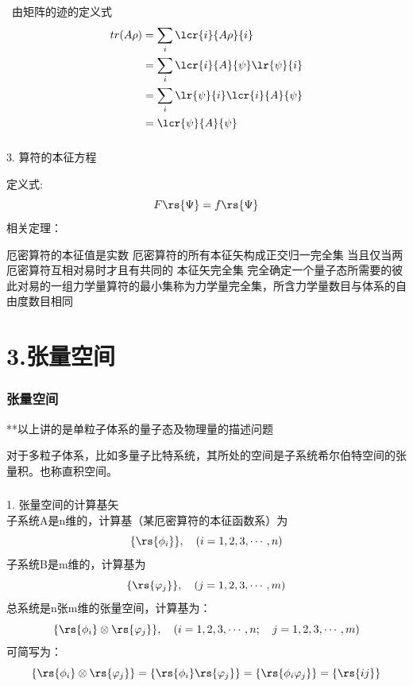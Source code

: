 \begin{frame}
    \frametitle{}
    \例[4.证明平均值公式-3 ]{
    \[\overline{F}=tr(A\rho)\]}
    \证~由矩阵的迹的定义式  
    \[\begin{aligned}
        tr(A\rho) &= \sum_i \lcr{i}{A\rho}{i} \\
        &= \sum_i \lcr{i}{A}{\psi}\lr{\psi}{i} \\
        &= \sum_i \lr{\psi}{i} \lcr{i}{A}{\psi}\\
        &= \lcr{\psi}{A}{\psi}\\
    \end{aligned}\]    
\end{frame}

\begin{frame}
    \frametitle{}
    3. 算符的本征方程
    \begin{itemize}
        \Item 定义式: \[F \rs{\Psi}=f\rs{\Psi}\]
        \Item 相关定理：
        \begin{itemize}
            \IItem 厄密算符的本征值是实数
            \IItem 厄密算符的所有本征矢构成正交归一完全集
            \IItem 当且仅当两厄密算符互相对易时才且有共同的
            本征矢完全集
            \IItem 完全确定一个量子态所需要的彼此对易的一组力学量算符的最小集称为力学量完全集，所含力学量数目与体系的自由度数目相同
            \end{itemize}
    \end{itemize}
\end{frame}

\section{3.张量空间}

\begin{frame}
    \frametitle{张量空间}
    **以上讲的是单粒子体系的量子态及物理量的描述问题
    \begin{tcolorbox4}[张量积]
    {\Bullet}对于多粒子体系，比如多量子比特系统，其所处的空间是子系统希尔伯特空间的张量积。也称直积空间。
    \end{tcolorbox4}
\end{frame}

\begin{frame}
    \frametitle{}
    1. 张量空间的计算基矢 \\
    子系统A是n维的，计算基（某厄密算符的本征函数系）为$$\{\rs{\phi_i}\},\quad (i=1,2,3,\cdots,n)$$ 
    子系统B是m维的，计算基为$$\{\rs{\varphi_j}\},\quad (j=1,2,3,\cdots,m)$$ 
    总系统是n张m维的张量空间，计算基为：$$\{\rs{\phi_i}\otimes\rs{\varphi_j}\},\quad (i=1,2,3,\cdots,n;\quad j=1,2,3,\cdots,m)$$ 
    可简写为：$$\{\rs{\phi_i}\otimes\rs{\varphi_j}\}=\{\rs{\phi_i}\rs{\varphi_j}\}=\{\rs{\phi_i\varphi_j}\}=\{\rs{ij}\}$$
\end{frame}

